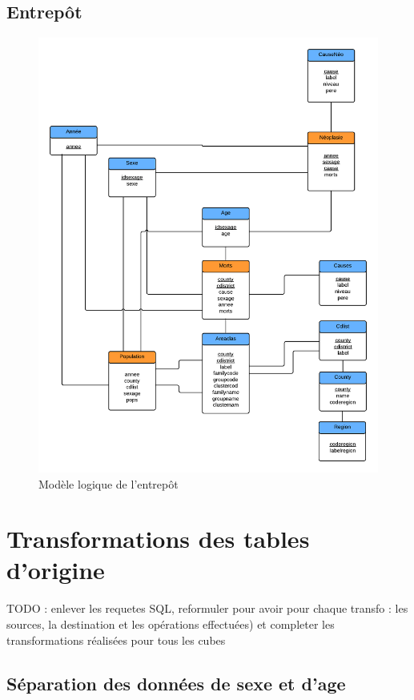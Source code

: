 \section{Entrepôt}
\begin{figure}[h!]
    \centering
    \includegraphics[width=\linewidth]{images/entrepot.png}
    \caption{Modèle logique de l'entrepôt}
    \label{conception_cube_néoplasies}
\end{figure}


\pagebreak


\chapter{Transformations des tables d'origine}

TODO : enlever les requetes SQL, reformuler pour avoir pour chaque transfo : les sources, la destination et les opérations effectuées) et completer les transformations réalisées pour tous les cubes

\section{Séparation des données de sexe et d'age}

